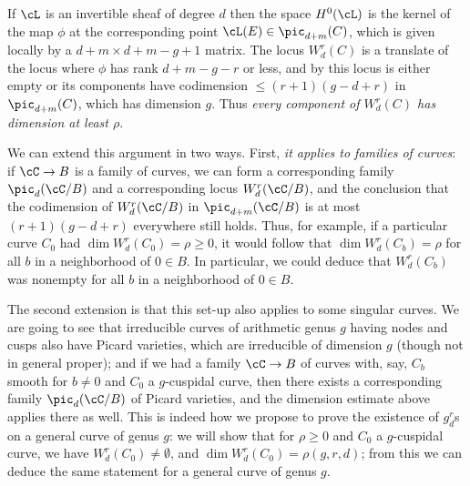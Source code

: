 If $\cL$ is an invertible sheaf of degree $d$ then the space $H^0(\cL)$ is the kernel of the map $\phi$ at the corresponding point $\cL(E) \in \pic_{d+m}(C)$, which is given locally by a $d+m \times d+m-g+1$ matrix. The locus $W^r_d(C)$ is a translate of the locus where $\phi$ has rank $d+m-g-r$ or less, and by \cite[****]{Eisenbud1995} this locus is either empty or its components have codimension $\leq (r+1)(g-d+r)$ in $\pic_{d+m}(C)$, which has dimension $g$. Thus \emph{every component of $W^r_d(C)$ has dimension at least $\rho$}.

We can extend this argument in two ways. First, \emph{it applies to families of curves}: if $\cC \to B$ is a family of curves, we can form a corresponding family $\pic_d(\cC / B)$ and a corresponding locus $W^r_d(\cC / B)$, and the conclusion that the codimension of $W^r_d(\cC / B)$ in $\pic_{d+m}(\cC / B)$ is at most $(r+1)(g-d+r)$ everywhere still holds. Thus, for example, if a particular curve $C_0$ had $\dim W^r_d(C_0) = \rho \geq 0$, it would follow that $\dim W^r_d(C_b) = \rho$ for all $b$ in a neighborhood of $0 \in B$. In particular, we could deduce that $W^r_d(C_b)$ was nonempty for all $b$ in a neighborhood of $0 \in B$.


The second extension is that this set-up also applies  to some singular curves. We are going to see that irreducible curves of arithmetic genus $g$ having nodes and cusps also have Picard varieties, which are irreducible of dimension $g$ (though not in general proper); and if we had a family $\cC \to B$ of curves with, say, $C_b$ smooth for $b \neq 0$ and $C_0$ a $g$-cuspidal curve, then there exists a corresponding family $\pic_d(\cC/B)$ of Picard varieties, and the dimension estimate above applies there as well. This is indeed how we propose to prove the existence of $g^r_d$s on a general curve of genus $g$: we will show that for $\rho \geq 0$ and $C_0$ a $g$-cuspidal curve,  we have $W^r_d(C_0) \neq \emptyset$, and
 $\dim W^r_d(C_0) = \rho(g,r,d)$; from this we can deduce the same statement for a general curve of genus $g$.



%
%
%

